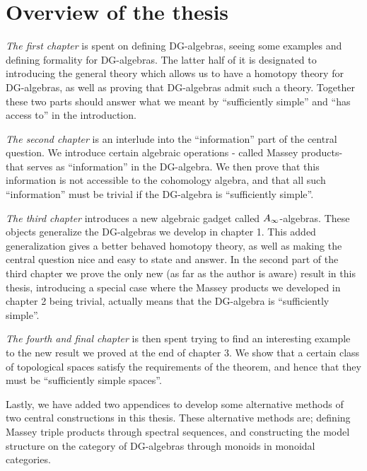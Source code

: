 

\section{Overview of the thesis}

\textit{The first chapter} is spent on defining DG-algebras, seeing some examples and  defining formality for DG-algebras. The latter half of it is designated to introducing the general theory which allows us to have a homotopy theory for DG-algebras, as well as proving that DG-algebras admit such a theory. Together these two parts should answer what we meant by ``sufficiently simple'' and ``has access to'' in the introduction.

\textit{The second chapter} is an interlude into the ``information'' part of the central question. We introduce certain algebraic operations - called Massey products- that serves as ``information'' in the DG-algebra. We then prove that this information is not accessible to the cohomology algebra, and that all such ``information'' must be trivial if the DG-algebra is ``sufficiently simple''. 

\textit{The third chapter} introduces a new algebraic gadget called $A_{\infty}$-algebras. These objects generalize the DG-algebras we develop in chapter 1. This added generalization gives a better behaved homotopy theory, as well as making the central question nice and easy to state and answer. In the second part of the third chapter we prove the only new (as far as the author is aware) result in this thesis, introducing a special case where the Massey products we developed in chapter 2 being trivial, actually means that the DG-algebra is ``sufficiently simple''. 

\textit{The fourth and final chapter} is then spent trying to find an interesting example to the new result we proved at the end of chapter 3. We show that a certain class of topological spaces satisfy the requirements of the theorem, and hence that they must be ``sufficiently simple spaces''. 

Lastly, we have added two appendices to develop some alternative methods of two central constructions in this thesis. These alternative methods are; defining Massey triple products through spectral sequences, and constructing the model structure on the category of DG-algebras through monoids in monoidal categories. 


